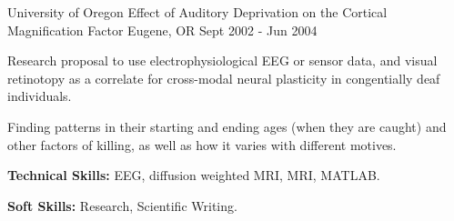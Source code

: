 \begin{cventries}
  \cventry
    {University of Oregon} %
    {Effect of Auditory Deprivation on the Cortical Magnification Factor} %
    {Eugene, OR} %
    {Sept 2002 - Jun 2004} %
    {
      \begin{cvitems} %
        \item {Research proposal to use electrophysiological EEG or sensor data, and visual retinotopy as a correlate for cross-modal neural plasticity in congentially deaf individuals.}
        \item {Finding patterns in their starting and ending ages (when they are caught) and other factors of killing, as well as how it varies with different motives.}
        \item {\textbf{Technical Skills:} EEG, diffusion weighted MRI, MRI, MATLAB.}
        \item {\textbf{Soft Skills:} Research, Scientific Writing.}
      \end{cvitems}
    }

\end{cventries}
